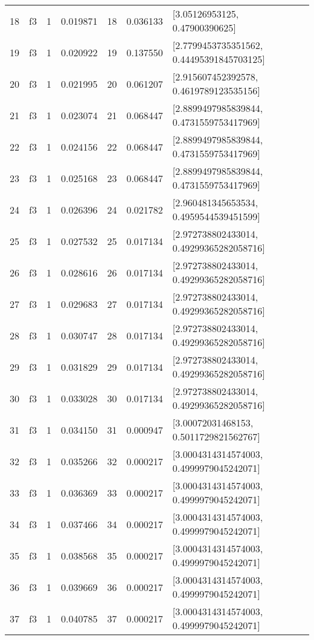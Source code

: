\begin{tabular}{lllrlrl}
18  &  f3 &   1 &  0.019871 &   18 &  0.036133 &             [3.05126953125, 0.47900390625] \\
19  &  f3 &   1 &  0.020922 &   19 &  0.137550 &  [2.7799453735351562, 0.44495391845703125] \\
20  &  f3 &   1 &  0.021995 &   20 &  0.061207 &    [2.915607452392578, 0.4619789123535156] \\
21  &  f3 &   1 &  0.023074 &   21 &  0.068447 &   [2.8899497985839844, 0.4731559753417969] \\
22  &  f3 &   1 &  0.024156 &   22 &  0.068447 &   [2.8899497985839844, 0.4731559753417969] \\
23  &  f3 &   1 &  0.025168 &   23 &  0.068447 &   [2.8899497985839844, 0.4731559753417969] \\
24  &  f3 &   1 &  0.026396 &   24 &  0.021782 &    [2.960481345653534, 0.4959544539451599] \\
25  &  f3 &   1 &  0.027532 &   25 &  0.017134 &   [2.972738802433014, 0.49299365282058716] \\
26  &  f3 &   1 &  0.028616 &   26 &  0.017134 &   [2.972738802433014, 0.49299365282058716] \\
27  &  f3 &   1 &  0.029683 &   27 &  0.017134 &   [2.972738802433014, 0.49299365282058716] \\
28  &  f3 &   1 &  0.030747 &   28 &  0.017134 &   [2.972738802433014, 0.49299365282058716] \\
29  &  f3 &   1 &  0.031829 &   29 &  0.017134 &   [2.972738802433014, 0.49299365282058716] \\
30  &  f3 &   1 &  0.033028 &   30 &  0.017134 &   [2.972738802433014, 0.49299365282058716] \\
31  &  f3 &   1 &  0.034150 &   31 &  0.000947 &     [3.00072031468153, 0.5011729821562767] \\
32  &  f3 &   1 &  0.035266 &   32 &  0.000217 &   [3.0004314314574003, 0.4999979045242071] \\
33  &  f3 &   1 &  0.036369 &   33 &  0.000217 &   [3.0004314314574003, 0.4999979045242071] \\
34  &  f3 &   1 &  0.037466 &   34 &  0.000217 &   [3.0004314314574003, 0.4999979045242071] \\
35  &  f3 &   1 &  0.038568 &   35 &  0.000217 &   [3.0004314314574003, 0.4999979045242071] \\
36  &  f3 &   1 &  0.039669 &   36 &  0.000217 &   [3.0004314314574003, 0.4999979045242071] \\
37  &  f3 &   1 &  0.040785 &   37 &  0.000217 &   [3.0004314314574003, 0.4999979045242071] \\

\end{tabular}
